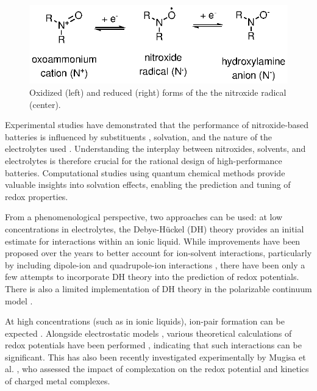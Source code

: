 \documentclass[review,preprint]{elsarticle}
\begin{document}
\begin{figure}[!h]
	\centering
	\includegraphics[width=.7\linewidth]{Figure1}
	\caption{Oxidized (left) and reduced (right) forms of the the nitroxide radical (center).}
	\label{fig:states}
\end{figure}

Experimental studies have demonstrated that the performance of nitroxide-based batteries is influenced by substituents \cite{sugaCathodeAnodeActivePoly2007}, solvation, and the nature of the electrolytes used \cite{armandIonicliquidMaterialsElectrochemical2009,strehmelRadicalsIonicLiquids2012,wylieIncreasedStabilityNitroxide2019b}. Understanding the interplay between nitroxides, solvents, and electrolytes is therefore crucial for the rational design of high-performance batteries. Computational studies using quantum chemical methods provide valuable insights into solvation effects, enabling the prediction and tuning of redox properties.

From a phenomenological perspective, two approaches can be used: at low concentrations in electrolytes, the Debye-Hückel (DH) theory \cite{kontogeorgisDebyeHuckelTheoryIts2018,silvaDerivationsDebyeHuckel2022,silvaImprovingBornEquation2024} provides an initial estimate for interactions within an ionic liquid. While improvements have been proposed over the years to better account for ion-solvent interactions, particularly by including dipole-ion \cite{silvaImprovingBornEquation2024} and quadrupole-ion interactions \cite{slavchovQuadrupoleTermsMaxwell2014,slavchovQuadrupoleTermsMaxwell2014a,coxQuadrupolemediatedDielectricResponse2021}, there have been only a few attempts \cite{matsuiDensityFunctionalTheory2013,xiaoReorganizationEnergyElectron2013,xiaoMolecularDebyeHuckelApproach2014} to incorporate DH theory into the prediction of redox potentials. There is also a limited implementation of DH theory in the polarizable continuum model \cite{cossiInitioStudyIonic1998}. 

At high concentrations (such as in ionic liquids), ion-pair formation can be expected \cite{marcusIonPairing2006}. Alongside electrostatic models \cite{krishtalikElectrostaticIonSolvent1991,lundDielectricInterpretationSpecificity2010}, various theoretical calculations of redox potentials have been performed \cite{mehtaTheoreticalInvestigationRedox2007,quAccurateModelingEffect2016,taherkhaniInvestigationIonPairs2022}, indicating that such interactions can be significant. This has also been recently investigated experimentally by Mugisa et al. \cite{mugisaEffectIonparingKinetics2024}, who assessed the impact of complexation on the redox potential and kinetics of charged metal complexes.
\end{document}
